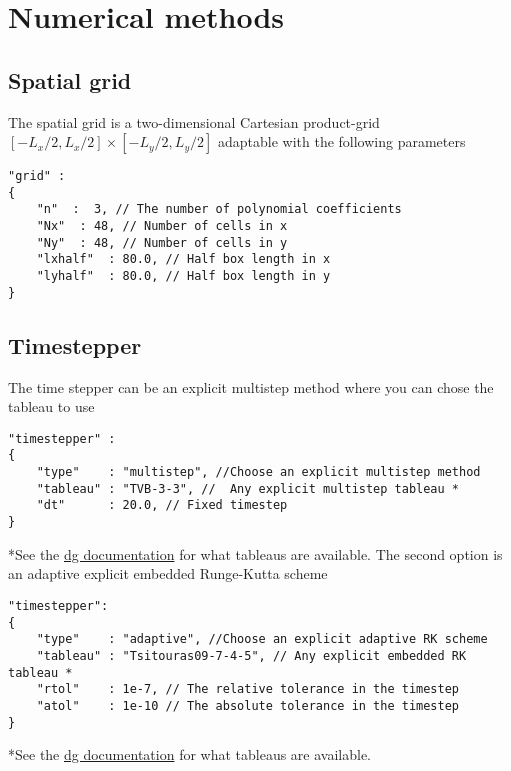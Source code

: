 \section{Numerical methods}

\subsection{Spatial grid}
The spatial grid is a two-dimensional Cartesian product-grid $[-L_x/2, L_x/2]\times [-L_y/2, L_y/2]$ adaptable with the following parameters
\begin{verbatim}
"grid" :
{
    "n"  :  3, // The number of polynomial coefficients
    "Nx"  : 48, // Number of cells in x
    "Ny"  : 48, // Number of cells in y
    "lxhalf"  : 80.0, // Half box length in x
    "lyhalf"  : 80.0, // Half box length in y
}
\end{verbatim}
\subsection{Timestepper}
The time stepper can be an explicit multistep method where you can chose the
tableau to use
\begin{verbatim}
"timestepper" :
{
    "type"    : "multistep", //Choose an explicit multistep method
    "tableau" : "TVB-3-3", //  Any explicit multistep tableau *
    "dt"      : 20.0, // Fixed timestep
}
\end{verbatim}
*See the \href{https://feltor-dev.github.io/doc/dg/html/structdg_1_1_explicit_multistep.html}{dg documentation} for what tableaus are available.
The second option is an adaptive explicit embedded Runge-Kutta scheme
\begin{verbatim}
"timestepper":
{
    "type"    : "adaptive", //Choose an explicit adaptive RK scheme
    "tableau" : "Tsitouras09-7-4-5", // Any explicit embedded RK tableau *
    "rtol"    : 1e-7, // The relative tolerance in the timestep
    "atol"    : 1e-10 // The absolute tolerance in the timestep
}
\end{verbatim}
*See the \href{https://feltor-dev.github.io/doc/dg/html/structdg_1_1_e_r_k_step.html}{dg documentation} for what tableaus are available.

